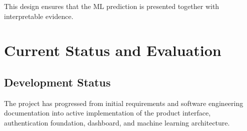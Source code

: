 \documentclass[12pt,a4paper]{report}
\begin{document}
This design ensures that the ML prediction is presented together with interpretable evidence.


\chapter{Current Status and Evaluation}

\section{Development Status}

The project has progressed from initial requirements and software engineering documentation into active implementation of the product interface, authentication foundation, dashboard, and machine learning architecture.
\end{document}

